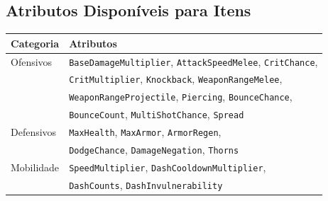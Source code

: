 \documentclass[a4paper,12pt]{report}
\begin{document}
\subsection{Atributos Disponíveis para Itens}
\begin{center}
\begin{tabular}{|l|l|}
    \hline
    \textbf{Categoria} & \textbf{Atributos} \\
    \hline
    Ofensivos  & \texttt{BaseDamageMultiplier}, \texttt{AttackSpeedMelee}, \texttt{CritChance}, \\
               & \texttt{CritMultiplier}, \texttt{Knockback}, \texttt{WeaponRangeMelee}, \\
               & \texttt{WeaponRangeProjectile}, \texttt{Piercing}, \texttt{BounceChance}, \\
               & \texttt{BounceCount}, \texttt{MultiShotChance}, \texttt{Spread} \\
    \hline
    Defensivos & \texttt{MaxHealth}, \texttt{MaxArmor}, \texttt{ArmorRegen}, \\
               & \texttt{DodgeChance}, \texttt{DamageNegation}, \texttt{Thorns} \\
    \hline
    Mobilidade & \texttt{SpeedMultiplier}, \texttt{DashCooldownMultiplier}, \\
               & \texttt{DashCounts}, \texttt{DashInvulnerability} \\
    \hline
\end{tabular}
\end{center}
\end{document}
